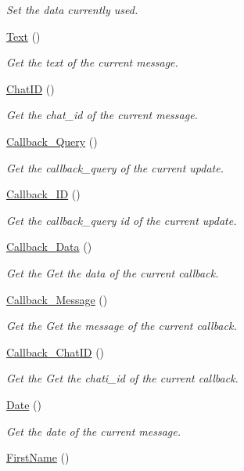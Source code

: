 \begin{DoxyCompactItemize}
\begin{DoxyCompactList}\small\item\em Set the data currently used. \end{DoxyCompactList}\item 
\hyperlink{class_telegram_a950a98ae75562dc9c6a458acbd330143}{Text} ()
\begin{DoxyCompactList}\small\item\em Get the text of the current message. \end{DoxyCompactList}\item 
\hyperlink{class_telegram_a4b624bab3560ed1e761aba1e7431cb6e}{Chat\+I\+D} ()
\begin{DoxyCompactList}\small\item\em Get the chat\+\_\+id of the current message. \end{DoxyCompactList}\item 
\hyperlink{class_telegram_a891f961aa0d3272c01ac9fe64f10a714}{Callback\+\_\+\+Query} ()
\begin{DoxyCompactList}\small\item\em Get the callback\+\_\+query of the current update. \end{DoxyCompactList}\item 
\hyperlink{class_telegram_a61006cd19798be37ae51af5bc405ec71}{Callback\+\_\+\+I\+D} ()
\begin{DoxyCompactList}\small\item\em Get the callback\+\_\+query id of the current update. \end{DoxyCompactList}\item 
\hyperlink{class_telegram_a0df77a257a02ef572ca7d745f659e98d}{Callback\+\_\+\+Data} ()
\begin{DoxyCompactList}\small\item\em Get the Get the data of the current callback. \end{DoxyCompactList}\item 
\hyperlink{class_telegram_ad72a9632c75419625e9f194f400a31c9}{Callback\+\_\+\+Message} ()
\begin{DoxyCompactList}\small\item\em Get the Get the message of the current callback. \end{DoxyCompactList}\item 
\hyperlink{class_telegram_a848317ddda1c61f7173e55e0253b12e0}{Callback\+\_\+\+Chat\+I\+D} ()
\begin{DoxyCompactList}\small\item\em Get the Get the chati\+\_\+id of the current callback. \end{DoxyCompactList}\item 
\hyperlink{class_telegram_aff49fc2cda4491ff4457ca481bb8edf9}{Date} ()
\begin{DoxyCompactList}\small\item\em Get the date of the current message. \end{DoxyCompactList}\item 
\hypertarget{class_telegram_a0e3e32188dd1631ed1ed673ac844d999}{}\hyperlink{class_telegram_a0e3e32188dd1631ed1ed673ac844d999}{First\+Name} ()\label{class_telegram_a0e3e32188dd1631ed1ed673ac844d999}


\end{DoxyCompactItemize}
